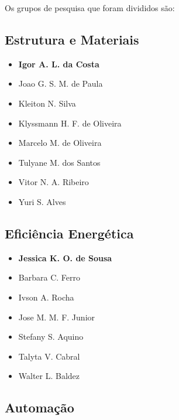 Os grupos de pesquisa que foram divididos são:

\subsection{Estrutura e Materiais}

\begin{itemize}
\item \textbf{Igor A. L. da Costa}

\item Joao G. S. M. de Paula

\item Kleiton N. Silva

\item Klyssmann H. F. de Oliveira

\item Marcelo M. de Oliveira

\item Tulyane M. dos Santos

\item Vitor N. A. Ribeiro

\item Yuri S. Alves
\end{itemize}

\subsection{Eficiência Energética}

\begin{itemize}
\item \textbf{Jessica K. O. de Sousa}

\item Barbara C. Ferro

\item Ivson A. Rocha

\item Jose M. M. F. Junior

\item Stefany S. Aquino

\item Talyta V. Cabral

\item Walter L. Baldez
\end{itemize}

\subsection{Automação}

